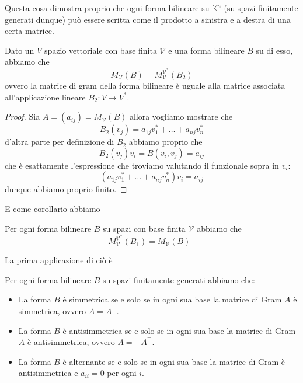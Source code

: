 \documentclass[11pt]{scrartcl}
\newcommand{\KK}{\mathbb{K}}
\begin{document}
	Questa cosa dimostra proprio che ogni forma bilineare su $\KK^n$ (su spazi finitamente generati dunque) può essere scritta come il prodotto a sinistra e a destra di una certa matrice.
	\begin{proposition}
		Dato un $V$ spazio vettoriale con base finita $\mathcal{V}$ e una forma bilineare $B$ su di esso, abbiamo che
		$$M_\mathcal{V}(B)=M_\mathcal{V}^\mathcal{V^*}(B_2)$$
		ovvero la matrice di gram della forma bilineare è uguale alla matrice associata all'applicazione lineare $B_2:V\to V^*$.
	\end{proposition}
	\begin{proof}
		Sia $A=(a_{ij})=M_\mathcal{V}(B)$ allora vogliamo mostrare che 
		$$B_2(v_j)=a_{1j}v_1^*+\dots+a_{nj}v_n^*$$
		d'altra parte per definizione di $B_2$ abbiamo proprio che
		$$B_2(v_j)v_i=B(v_i,v_j)=a_{ij}$$
		che è esattamente l'espressione che troviamo valutando il funzionale sopra in $v_i$:
		$$\left(a_{1j}v_1^*+\dots+a_{nj}v_n^*\right)v_i=a_{ij}$$
		dunque abbiamo proprio finito.
	\end{proof}
	E come corollario abbiamo
	\begin{corollary}
		Per ogni forma bilineare $B$ su spazi con base finita $\mathcal{V}$ abbiamo che
		$$M_\mathcal{V}^\mathcal{V^*}(B_1)=M_\mathcal{V}(B)^\intercal$$
	\end{corollary}
	La prima applicazione di ciò è
	\begin{proposition}
		Per ogni forma bilineare $B$ su spazi finitamente generati abbiamo che:
		\begin{itemize}
			\item La forma $B$ è simmetrica se e solo se in ogni sua base la matrice di Gram $A$ è simmetrica, ovvero $A=A^\intercal$.
			\item La forma $B$ è antisimmetrica se e solo se in ogni sua base la matrice di Gram $A$ è antisimmetrica, ovvero $A=-A^\intercal$.
			\item La forma $B$ è alternante se e solo se in ogni sua base la matrice di Gram è antisimmetrica e $a_{ii}=0$ per ogni $i$.
		\end{itemize}
	\end{proposition}
	
\end{document}
